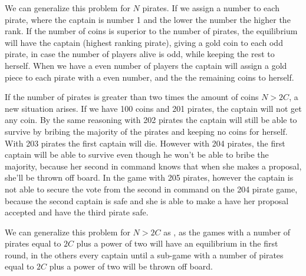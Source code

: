 We can generalize this problem for $N$ pirates. If we assign a number to each pirate, where the captain is number 1 and the lower the number the higher the rank. If the number of coins is superior to the number of pirates, the equilibrium will have the captain (highest ranking pirate), giving a gold coin to each odd pirate, in case the number of players alive is odd, while keeping the rest to herself. When we have a even number of players the captain will assign a gold piece to each pirate with a even number, and the the remaining coins to herself. 

If the number of pirates is greater than two times the amount of coins $N>2C$, a new situation arises. If we have 100 coins and 201 pirates, the captain will not get any coin. By the same reasoning with 202 pirates the captain will still be able to survive by bribing the majority of the pirates and keeping no coins for herself. With 203 pirates the first captain will die. However with 204 pirates, the first captain will be able to survive even though he won't be able to bribe the majority, because her second in command knows that when she makes a proposal, she'll be thrown off board. In the game with 205 pirates, however the captain is not able to secure the vote from the second in command on the 204 pirate game, because the second captain is safe and she is able to make a have her proposal accepted and have the third pirate safe. 

We can generalize this problem for $N>2C$ as \cite{Stewart1999}, as the games with a number of pirates equal to $2C$ plus a power of two will have an equilibrium in the first round, in the others every captain until a sub-game with a number of pirates equal to $2C$ plus a power of two will be thrown off board.

